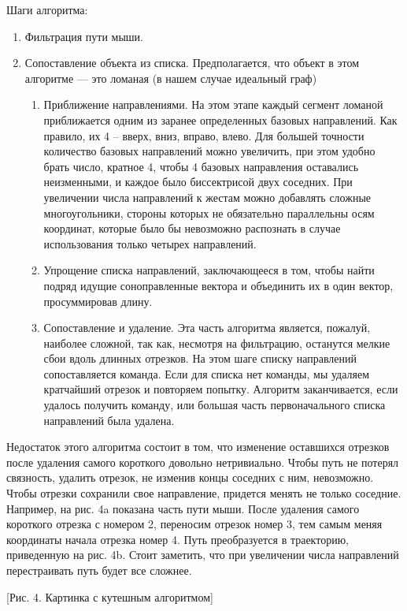 \documentclass[a5paper]{article}
\begin{document}
Шаги алгоритма:
\begin{enumerate}
  \item Фильтрация пути мыши.
  \item Сопоставление объекта из списка. Предполагается, что объект в этом алгоритме — это ломаная (в нашем случае идеальный граф)
  \begin{enumerate}
    \item Приближение направлениями. На этом этапе каждый сегмент ломаной приближается одним из заранее определенных базовых направлений. 
Как правило, их 4 – вверх, вниз, вправо, влево. Для большей точности количество базовых направлений можно увеличить, при этом удобно 
брать число, кратное 4, чтобы 4 базовых направления оставались неизменными, и каждое было биссектрисой двух соседних. При увеличении числа 
направлений к жестам можно добавлять сложные многоугольники, стороны которых не обязательно параллельны осям координат, которые было бы 
невозможно распознать в случае использования только четырех направлений.
    \item Упрощение списка направлений, заключающееся в том, чтобы найти подряд идущие соноправленные вектора и объединить их в 
один вектор, просуммировав длину.
    \item Сопоставление и удаление. Эта часть алгоритма является, пожалуй, наиболее сложной, так как, несмотря на фильтрацию, останутся 
мелкие сбои вдоль длинных отрезков. На этом шаге списку направлений сопоставляется команда. Если для списка нет команды, мы удаляем 
кратчайший отрезок и повторяем попытку. Алгоритм заканчивается, если удалось получить команду, или большая часть первоначального списка 
направлений была удалена.
  \end{enumerate}
\end{enumerate}

Недостаток этого алгоритма состоит в том, что изменение оставшихся отрезков после удаления самого короткого довольно нетривиально. 
Чтобы путь не потерял связность, удалить отрезок, не изменив концы соседних с ним, невозможно. Чтобы отрезки сохранили свое направление, 
придется менять не только соседние. Например, на рис. 4a показана часть пути мыши. После удаления самого короткого отрезка с номером 2, 
переносим отрезок номер 3, тем самым меняя координаты начала отрезка номер 4. Путь преобразуется в траекторию, приведенную на рис. 4b.
Стоит заметить, что при увеличении числа направлений перестраивать путь будет все сложнее. 

[Рис. 4. Картинка с кутешным алгоритмом]
\end{document}
